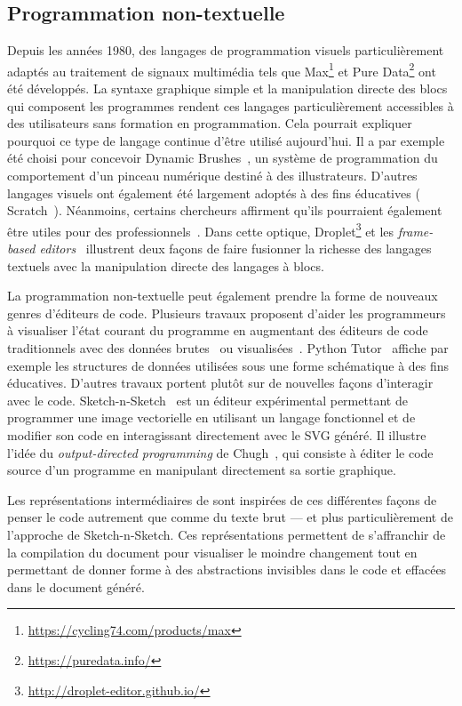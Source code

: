 \subsection{Programmation non-textuelle}

Depuis les années 1980, des langages de programmation visuels particulièrement adaptés au traitement de signaux multimédia tels que Max\footnote{\url{https://cycling74.com/products/max}} et Pure Data\footnote{\url{https://puredata.info/}} ont été développés.
La syntaxe graphique simple et la manipulation directe des blocs qui composent les programmes rendent ces langages particulièrement accessibles à des utilisateurs sans formation en programmation.
Cela pourrait expliquer pourquoi ce type de langage continue d'être utilisé aujourd'hui.
Il a par exemple été choisi pour concevoir Dynamic Brushes~\cite{jacobs2018extending}, un système de programmation du comportement d'un pinceau numérique destiné à des illustrateurs.
D'autres langages visuels ont également été largement adoptés à des fins éducatives (\eg{} Scratch~\cite{resnick2009scratch}).
Néanmoins, certains chercheurs affirment qu'ils pourraient également être utiles pour des professionnels~\cite{bau2017learnable}.
Dans cette optique, Droplet\footnote{\url{http://droplet-editor.github.io/}} et les \emph{frame-based editors}~\cite{brown2016framebased} illustrent deux façons de 
faire fusionner la richesse des langages textuels avec la manipulation directe des langages à blocs.

La programmation non-textuelle peut également prendre la forme de nouveaux genres d'éditeurs de code.
Plusieurs travaux proposent d'aider les programmeurs à visualiser l'état courant du programme en augmentant des éditeurs de code traditionnels avec des données brutes~\cite{lerner2020projection} ou visualisées~\cite{hoffswell2018augmenting}.
Python Tutor~\cite{guo2013online} affiche par exemple les structures de données utilisées sous une forme schématique à des fins éducatives.
D'autres travaux portent plutôt sur de nouvelles façons d'interagir avec le code.
Sketch-n-Sketch~\cite{hempel2019sketchnsketch} est un éditeur expérimental permettant de programmer une image vectorielle en utilisant un langage fonctionnel et de modifier son code en interagissant directement avec le SVG généré.
Il illustre l'idée du \emph{output-directed programming} de Chugh~\cite{chugh2016programmatic}, qui consiste à éditer le code source d'un programme en manipulant directement sa sortie graphique.

Les représentations intermédiaires de \iLaTeX{} sont inspirées de ces différentes façons de penser le code autrement que comme du texte brut --- et plus particulièrement de l'approche de Sketch-n-Sketch.
Ces représentations permettent de s'affranchir de la compilation du document pour visualiser le moindre changement tout en permettant de donner forme à des abstractions invisibles dans le code et effacées dans le document généré.



